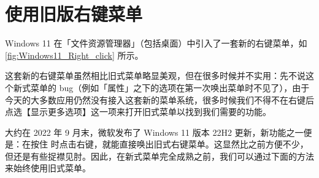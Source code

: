 \section{使用旧版右键菜单}

Windows 11 在「文件资源管理器」（包括桌面）中引入了一套新的右键菜单，如\autoref{fig:Windows11_Right_click} 所示。

这套新的右键菜单虽然相比旧式菜单略显美观，但在很多时候并不实用：先不说这个新式菜单的 bug（例如「属性」之下的选项在第一次唤出菜单时不见了），由于今天的大多数应用仍然没有接入这套新的菜单系统，很多时候我们不得不在右键后点选【显示更多选项】这一项来打开旧式菜单以找到我们需要的功能。

大约在 2022 年 9 月末，微软发布了 Windows 11 版本 22H2 更新，新功能之一便是：在按住  时点击右键，就能直接唤出旧式右键菜单。这显然比之前方便不少，但还是有些捉襟见肘。因此，在新式菜单完全成熟之前，我们可以通过下面的方法来始终使用旧式菜单。


